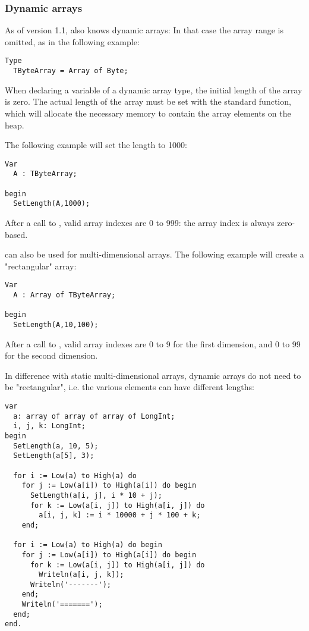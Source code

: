 \subsubsection{Dynamic arrays}
As of version 1.1, \fpc also knows dynamic arrays: In that case the array
range is omitted, as in the following example:
\begin{verbatim}
Type
  TByteArray = Array of Byte;
\end{verbatim}
When declaring a variable of a dynamic array type, the initial length of the
array is zero. The actual length of the array must be set with the standard
 function, which will allocate the necessary memory to contain 
the array elements on the heap. 

The following example will set the length to 1000:
\begin{verbatim}
Var 
  A : TByteArray;

begin
  SetLength(A,1000);
\end{verbatim}
After a call to , valid array indexes are 0 to 999: the array
index is always zero-based.

 can also be used for multi-dimensional arrays. The following example will create
a "rectangular" array:
\begin{verbatim}
Var 
  A : Array of TByteArray;

begin
  SetLength(A,10,100);
\end{verbatim}
After a call to , valid array indexes are 0 to 9 for the
first dimension, and 0 to 99 for the second dimension.

In difference with static multi-dimensional arrays, dynamic arrays do not
need to be "rectangular", i.e. the various elements can have different
lengths:
\begin{verbatim}
var
  a: array of array of array of LongInt;
  i, j, k: LongInt;
begin
  SetLength(a, 10, 5);
  SetLength(a[5], 3);

  for i := Low(a) to High(a) do
    for j := Low(a[i]) to High(a[i]) do begin
      SetLength(a[i, j], i * 10 + j);
      for k := Low(a[i, j]) to High(a[i, j]) do
        a[i, j, k] := i * 10000 + j * 100 + k;
    end;

  for i := Low(a) to High(a) do begin
    for j := Low(a[i]) to High(a[i]) do begin
      for k := Low(a[i, j]) to High(a[i, j]) do
        Writeln(a[i, j, k]);
      Writeln('-------');
    end;
    Writeln('=======');
  end;
end.
\end{verbatim}

